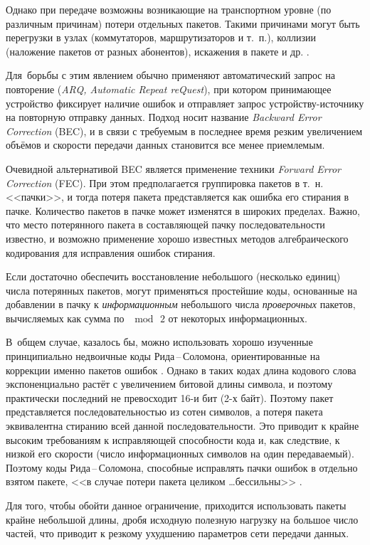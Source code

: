 Однако при передаче возможны возникающие на транспортном уровне (по различным причинам) потери отдельных пакетов.
Такими причинами могут быть перегрузки в узлах (коммутаторов, маршрутизаторов и т.~п.), коллизии (наложение пакетов от разных абонентов),
искажения в пакете и др. \cite{Kubickij-2011}.

Для~борьбы с этим явлением обычно применяют автоматический запрос на повторение (\emph{ARQ, Automatic Repeat reQuest}),
при котором принимающее устройство фиксирует наличие ошибок и отправляет запрос устройству-источнику на повторную отправку данных.
Подход носит название \emph{Backward Error Correction} (BEC), и в связи с требуемым в последнее время резким увеличением объёмов и скорости передачи
данных становится все менее приемлемым.

Очевидной альтернативой BEC является применение техники \emph{Forward Error Correction} (FEC).
При этом предполагается группировка пакетов в т.~н. <<пачки>>, и тогда потеря пакета представляется как ошибка его стирания в пачке.
Количество пакетов в пачке может изменятся в широких пределах.
Важно, что место потерянного пакета в составляющей пачку последовательности известно, и возможно применение хорошо известных
методов алгебраического кодирования для исправления ошибок стирания.

Если достаточно обеспечить восстановление небольшого (несколько единиц) числа потерянных пакетов, могут применяться простейшие коды, основанные на добавлении в пачку к \emph{информационным} небольшого числа \emph{проверочных} пакетов, вычисляемых как сумма по $\mod\,2$ от некоторых
информационных.

В~общем случае, казалось бы, можно использовать хорошо изученные принципиально недвоичные коды Рида\,--\,Соломона,
ориентированные на коррекции именно пакетов ошибок \cite{MWill&Sl-79}.
Однако в таких кодах длина кодового слова экспоненциально растёт с увеличением битовой длины символа,
и поэтому практически последний не превосходит 16-и бит (2-х байт).
Поэтому пакет представляется последовательностью из сотен символов, а потеря пакета эквивалентна стиранию всей данной последовательности.
Это приводит к крайне высоким требованиям к исправляющей способности кода и, как следствие, к низкой его скорости
(число информационных символов на один передаваемый).
Поэтому коды Рида\,--\,Соломона, способные исправлять пачки ошибок в отдельно взятом пакете,
<<в случае потери пакета целиком \dots бессильны>> \cite{Shin-Kor-2008}.

Для того, чтобы обойти данное ограничение, приходится использовать пакеты крайне небольшой длины,
дробя исходную полезную нагрузку на большое число частей, что приводит к резкому ухудшению параметров сети передачи данных.

